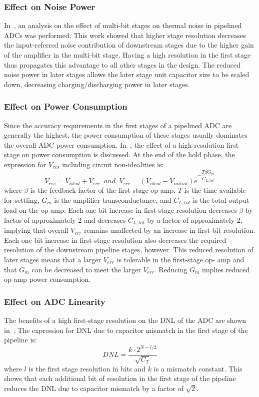 \subsubsection{Effect on Noise Power}
In~\cite{5731352}, an analysis on the effect of multi-bit stages on thermal noise in pipelined ADCs was performed. This work showed that higher stage resolution decreases the input-referred noise contribution of downstream stages due to the higher gain of the amplifier in the multi-bit stage. Having a high resolution in the first stage thus propagates this advantage to all other stages 
in the design. The reduced noise power in later stages allows the later stage unit capacitor size to be scaled down, decreasing charging/discharging power in later stages. 
\subsubsection{Effect on Power Consumption}
\label{sec:firststagepower}
Since the accuracy requirements in the first stages of a pipelined ADC are generally the highest, the power consumption of these stages usually dominates the overall ADC power consumption. In~\cite{5714725}, the effect of a 
high resolution first stage on power consumption is discussed. At the end of the hold phase, the expression for $V_{res}$ including circuit non-idealities is:
\begin{equation}
\label{eq:vres}
V_{res} = V_{ideal}+V_{err}\;\; and\;\; V_{err} = (V_{ideal}-V_{initial})e^{-\dfrac{T\beta G_m}{C_{L,tot}}}
\end{equation}
where $\beta$ is the feedback factor of the first-stage op-amp, $T$ is the time available for settling, $G_m$ is the amplifier transconductance, and $C_{L,tot}$ is the total output load on the op-amp. Each one bit increase in 
first-stage resolution decreases $\beta$ by factor of approximately 2 and decreases $C_{L,tot}$ by a factor of approximately 2, implying that overall $V_{err}$ remains unaffected by an increase in first-bit resolution. Each one bit increase in first-stage resolution also decreases the required resolution of the downstream pipeline stages, however. This reduced resolution of later stages means that a larger $V_{err}$ is tolerable in the first-stage op-
amp and that $G_m$ can be decreased to meet the larger $V_{err}$. Reducing $G_m$ implies reduced op-amp power consumption.
\subsubsection{Effect on ADC Linearity}
The benefits of a high first-stage resolution on the DNL of the ADC are shown in~\cite{4541339}. The expression for DNL due to capacitor mismatch in the first stage of the pipeline is:
\begin{equation}
\label{eq:dnlfirststagecapmismatch}
DNL = \dfrac{k\cdot 2^{N-l/2}}{\sqrt{C_{T}}}
\end{equation}
where $l$ is the first stage resolution in bits and $k$ is a mismatch constant. This shows that each additional bit of resolution in the first stage of the pipeline reduces the DNL due to capacitor mismatch by a factor of $
\sqrt2$. 

